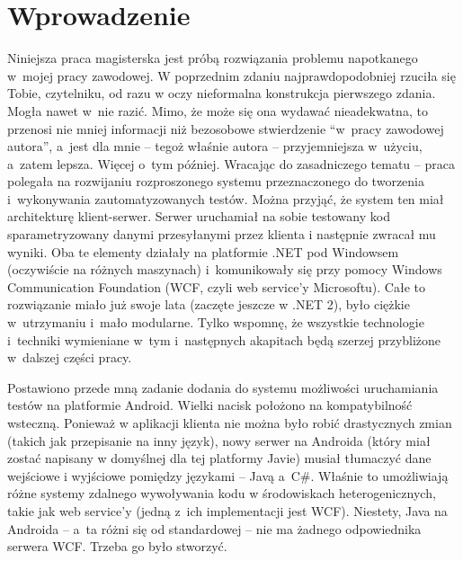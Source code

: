 \chapter{Wprowadzenie}
\label{intro}

Niniejsza praca magisterska jest próbą rozwiązania problemu napotkanego w~mojej pracy zawodowej. W poprzednim zdaniu najprawdopodobniej rzuciła się Tobie, czytelniku, od razu w oczy nieformalna konstrukcja pierwszego zdania. Mogła nawet w~nie razić. Mimo, że może się ona wydawać nieadekwatna, to przenosi nie mniej informacji niż bezosobowe stwierdzenie ``w~pracy zawodowej autora'', a~jest dla mnie -- tegoż właśnie autora -- przyjemniejsza w~użyciu, a~zatem lepsza. Więcej o~tym później. Wracając do zasadniczego tematu -- praca polegała na rozwijaniu rozproszonego systemu przeznaczonego do tworzenia i~wykonywania zautomatyzowanych testów. Można przyjąć, że system ten miał architekturę klient-serwer. Serwer uruchamiał na sobie testowany kod sparametryzowany danymi przesyłanymi przez klienta i następnie zwracał mu wyniki. Oba te elementy działały na platformie .NET pod Windowsem (oczywiście na różnych maszynach) i~komunikowały się przy pomocy Windows Communication Foundation (WCF, czyli web service'y Microsoftu). Całe to rozwiązanie miało już swoje lata (zaczęte jeszcze w .NET 2), było ciężkie w~utrzymaniu i~mało modularne. Tylko wspomnę, że wszystkie technologie i~techniki wymieniane w~tym i~następnych akapitach będą szerzej przybliżone w~dalszej części pracy.

Postawiono przede mną zadanie dodania do systemu możliwości uruchamiania testów na platformie Android. Wielki nacisk położono na kompatybilność wsteczną. Ponieważ w aplikacji klienta nie można było robić drastycznych zmian (takich jak przepisanie na inny język), nowy serwer na Androida (który miał zostać napisany w domyślnej dla tej platformy Javie) musiał tłumaczyć dane wejściowe i wyjściowe pomiędzy językami -- Javą a~C\#.  Właśnie to umożliwiają różne systemy zdalnego wywoływania kodu w środowiskach heterogenicznych, takie jak web service'y (jedną z~ich implementacji jest WCF). Niestety, Java na Androida -- a~ta różni się od standardowej -- nie ma żadnego odpowiednika serwera WCF. Trzeba go było stworzyć.

